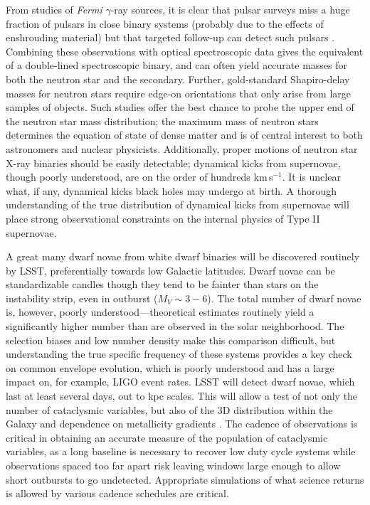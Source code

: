 From studies of \emph{Fermi} $\gamma$-ray sources, it is clear that pulsar
surveys miss a huge fraction of pulsars in close binary systems (probably due
to the effects of enshrouding material) but that targeted follow-up can detect
such pulsars \citep{2012arXiv1205.3089R}. Combining these observations with
optical spectroscopic data gives the equivalent of a double-lined spectroscopic
binary, and can often yield accurate masses for both the neutron star and the
secondary. Further, gold-standard Shapiro-delay masses for neutron stars
require edge-on orientations that only arise from large samples of objects.
Such studies offer the best chance to probe the upper end of the neutron star
mass distribution; the maximum mass of neutron stars determines the equation of
state of dense matter and is of central interest to both astronomers and
nuclear physicists. Additionally, proper motions of neutron star X-ray binaries
should be easily detectable; dynamical kicks from supernovae, though poorly
understood, are on the order of hundreds km\,s$^{-1}$. It is unclear what, if
any, dynamical kicks black holes may undergo at birth. A thorough understanding
of the true distribution of dynamical kicks from supernovae will place strong
observational constraints on the internal physics of Type II supernovae. 

A great many dwarf novae from white dwarf binaries will be discovered routinely
by LSST, preferentially towards low Galactic latitudes. Dwarf novae can be
standardizable candles \citep{2011MNRAS.411.2695P} though they tend to be fainter
than stars on the instability strip, even in outburst ($M_{V}\sim 3-6$). The
total number of dwarf novae is, however, poorly understood---theoretical
estimates routinely yield a significantly higher number than are observed in
the solar neighborhood. The selection biases and low number density make this
comparison difficult, but understanding the true specific frequency of these
systems provides a key check on common envelope evolution, which is poorly
understood and has a large impact on, for example, LIGO event rates. LSST will
detect dwarf novae, which last at least several days, out to kpc scales. This
will allow a test of not only the number of cataclysmic variables, but also of
the 3D distribution within the Galaxy and dependence on metallicity gradients
\citep{2015MNRAS.448.3455B}. The cadence of observations is critical in obtaining an
accurate measure of the population of cataclysmic variables, as a long baseline
is necessary to recover low duty cycle systems while observations spaced too
far apart risk leaving windows large enough to allow short outbursts to go
undetected. Appropriate simulations of what science returns is allowed by
various cadence schedules are critical.

